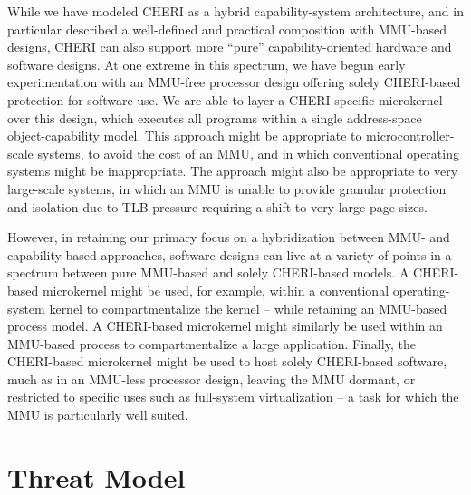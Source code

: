 While we have modeled CHERI as a hybrid capability-system architecture, and in
particular described a well-defined and practical composition with MMU-based
designs, CHERI can also support more ``pure'' capability-oriented hardware and
software designs.
At one extreme in this spectrum, we have begun early experimentation with an
MMU-free processor design offering solely CHERI-based protection for software
use.
We are able to layer a CHERI-specific microkernel over this design, which
executes all programs within a single address-space object-capability model.
This approach might be appropriate to microcontroller-scale systems, to avoid
the cost of an MMU, and in which conventional operating systems might be
inappropriate.
The approach might also be appropriate to very large-scale systems, in which
an MMU is unable to provide granular protection and isolation due to TLB
pressure requiring a shift to very large page sizes.

However, in retaining our primary focus on a hybridization between MMU- and
capability-based approaches, software designs can live at a variety of points
in a spectrum between pure MMU-based and solely CHERI-based models.
A CHERI-based microkernel might be used, for example, within a conventional
operating-system kernel to compartmentalize the kernel -- while retaining an
MMU-based process model.
A CHERI-based microkernel might similarly be used within an MMU-based process
to compartmentalize a large application.
Finally, the CHERI-based microkernel might be used to host solely CHERI-based
software, much as in an MMU-less processor design, leaving the MMU dormant,
or restricted to specific uses such as full-system virtualization -- a task
for which the MMU is particularly well suited.

\section{Threat Model}

%

